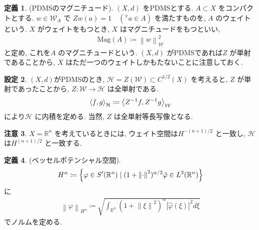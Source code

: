 \documentclass[10pt, fleqn, label-section=none]{bxjsarticle}
\theoremstyle{definition}
\newtheorem{dfn}{定義}[section]
\newtheorem{setting}[dfn]{設定}
\newtheorem{remark}[dfn]{注意}
\newcommand{\any}{{}^{\forall}}
\newcommand{\cbra}[1]{\mleft\{#1\mright\}}
\newcommand{\tbra}[1]{\mleft\langle#1\mright\rangle}
\newcommand{\abs}[1]{\left|#1\right|}
\newcommand{\norm}[1]{\left\|#1\right\|}
\renewcommand{\;}{\, ; \,}
\newcommand{\Mag}{\textrm{Mag}}
\begin{document}
\begin{dfn}(PDMSのマグニチュード). $(X, d)$ をPDMSとする. $A \subset X$ をコンパクトとする. $w \in \mathcal W_A$ で
$Zw(a) = 1 \quad (\any a \in A)$ を満たすものを, $A$ のウェイトという. $X$ がウェイトをもつとき, $X$ はマグニチュードをもつといい, 
\begin{align*} \Mag(A) \coloneqq \norm{w} _{\mathcal W} ^2\end{align*}
と定め, これを$A$ のマグニチュードという. $(X, d)$ がPDMSであれば$Z$ が単射であることから, $X$ はただ一つのウェイトしかもたないことに注意しておく. 
\end{dfn}




\begin{setting}$(X, d)$がPDMSのとき, $\mathcal H = Z(\mathcal W) \subset C^{1/2}(X)$ を考えると, $Z$ が単射であったことから, $Z: \mathcal W \rightarrow \mathcal H$ は全単射である. 
\begin{align*} \tbra{f, g}_{\mathcal H} \coloneqq \tbra{Z^{-1}f, Z^{-1}g}_{\mathcal W} \end{align*}
により$\mathcal H$ に内積を定める. 当然, $Z$ は全単射等長写像となる. 
\end{setting}

\begin{remark}
$X = \mathbb R^n$ を考えているときには, ウェイト空間は$H^{-(n+1)/2}$ と一致し, $\mathcal H$ は$H^{(n+1)/2}$ と一致する. 
\end{remark}





\begin{dfn}(ベッセルポテンシャル空間). 
\begin{align*} H^\alpha \coloneqq \cbra{ \varphi \in S^\prime (\mathbb R^n) \mid (1 + \norm{\cdot} ^2) ^{\alpha/2} \hat \varphi \in L^2(\mathbb R^n)}  \end{align*}
に
\begin{align*} \norm{\varphi }_{H^\alpha} \coloneqq \sqrt{ \int_{\mathbb R^n} (1 + \norm \xi ^2) ^\alpha \abs{\hat \varphi(\xi)} ^2 d\xi }  \end{align*}
でノルムを定める. 
\end{dfn}
\end{document}
